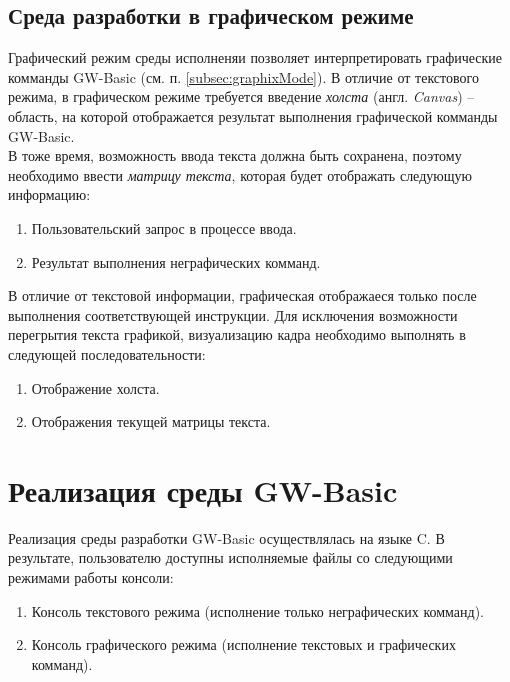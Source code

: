 \documentclass[12pt]{article}
\begin{document}
			\subsection{Среда разработки в графическом режиме}
			\label{subsec:ideArch}
			\hspace{\parindent} Графический режим среды исполненяи позволяет интерпретировать графические комманды GW-Basic (см. п. \ref{subsec:graphixMode}). В отличие от текстового режима, в графическом режиме требуется введение {\it холста} (англ. {\it Canvas}) -- область, на которой отображается результат выполнения графической комманды GW-Basic. \\ 
			\indent В тоже время, возможность ввода текста должна быть сохранена, поэтому необходимо ввести {\it матрицу текста}, которая будет отображать следующую информацию:
			\begin{enumerate}
				\item Пользовательский запрос в процессе ввода.
				\item Результат выполнения неграфических комманд.
			\end{enumerate}

			\indent В отличие от текстовой информации, графическая отображаеся только после выполнения соответствующей инструкции. Для исключения возможности перегрытия текста графикой, визуализацию кадра необходимо выполнять в следующей последовательности:
			\begin{enumerate}
				\item Отображение холста.
				\item Отображения текущей матрицы текста.
			\end{enumerate}
			
	\newpage
	\section{Реализация среды GW-Basic}
		\hspace{\parindent} Реализация среды разработки GW-Basic осуществлялась на языке C. В результате, пользователю доступны исполняемые файлы со следующими режимами работы консоли:
		\begin{enumerate}
			\item Консоль текстового режима (исполнение только неграфических комманд).
			\item Консоль графического режима (исполнение текстовых и графических комманд).
		\end{enumerate}
		
\end{document}
